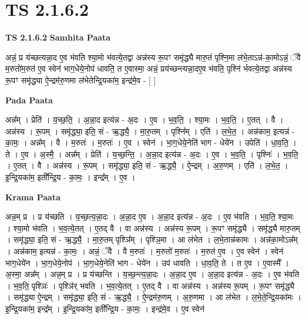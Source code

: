 \documentclass[17pt]{extarticle}
\begin{document}
\section{ TS 2.1.6.2 }

\textbf{TS 2.1.6.2 } \newline
\textbf{Samhita Paata} \newline

अन्नं॒ प्र य॑च्छत्यन्ना॒द ए॒व भ॑वति श्या॒मो भ॑वत्ये॒तद्वा अन्न॑स्य रू॒पꣳ समृ॑द्ध्यै मारु॒तं पृश्नि॒मा ल॑भे॒ताऽन्न॑-का॒मोऽन्नं॒ ॅवै म॒रुतो॑म॒रुत॑ ए॒व स्वेन॑ भाग॒धेये॒नोप॑ धावति॒ त ए॒वास्मा॒ अन्नं॒ प्रय॑च्छन्त्यन्ना॒द‌ए॒व भ॑वति॒ पृश्नि॑ र्भवत्ये॒तद्वा अन्न॑स्य रू॒पꣳ समृ॑द्ध्या ऐ॒न्द्रम॑रु॒णमा ल॑भेतेन्द्रि॒यका॑म॒ इन्द्र॑मे॒व - [  ] \newline

\textbf{Pada Paata} \newline

अन्न᳚म् । प्रेति॑ । य॒च्छ॒ति॒ । अ॒न्ना॒द इत्य॑न्न - अ॒दः । ए॒व । भ॒व॒ति॒ । श्या॒मः । भ॒व॒ति॒ । ए॒तत् । वै । अन्न॑स्य । रू॒पम् । समृ॑द्ध्या॒ इति॒ सं - ऋ॒द्ध्यै॒ । मा॒रु॒तम् । पृश्नि᳚म् । एति॑ । ल॒भे॒त॒ । अन्न॑काम॒ इत्यन्न॑ - का॒मः॒ । अन्न᳚म् । वै । म॒रुतः॑ । म॒रुतः॑ । ए॒व । स्वेन॑ । भा॒ग॒धेये॒नेति॑ भाग - धेये॑न । उपेति॑ । धा॒व॒ति॒ । ते । ए॒व । अ॒स्मै॒ । अन्न᳚म् । प्रेति॑ । य॒च्छ॒न्ति॒ । अ॒न्ना॒द इत्य॑न्न - अ॒दः । ए॒व । भ॒व॒ति॒ । पृश्निः॑ । भ॒व॒ति॒ । ए॒तत् । वै । अन्न॑स्य । रू॒पम् । समृ॑द्ध्या॒ इति॒ सं - ऋ॒द्ध्यै॒ । ऐ॒न्द्रम् । अ॒रु॒णम् । एति॑ । ल॒भे॒त॒ । इ॒न्द्रि॒यका॑म॒ इती᳚न्द्रि॒य - का॒मः॒ । इन्द्र᳚म् । ए॒व ।  \newline


\textbf{Krama Paata} \newline

अन्न॒म् प्र । प्र य॑च्छति । य॒च्छ॒त्य॒न्ना॒दः । अ॒न्ना॒द ए॒व । अ॒न्ना॒द इत्य॑न्न - अ॒दः । ए॒व भ॑वति । भ॒व॒ति॒ श्या॒मः । श्या॒मो भ॑वति । भ॒व॒त्ये॒तत् । ए॒तद् वै । वा अन्न॑स्य । अन्न॑स्य रू॒पम् । रू॒पꣳ समृ॑द्ध्यै । समृ॑द्ध्यै मारु॒तम् । समृ॑द्ध्या॒ इति॒ सं - ऋ॒द्ध्यै॒ । मा॒रु॒तम् पृश्ञि᳚म् । पृश्ञि॒मा । आ ल॑भेत । ल॒भे॒तान्न॑कामः । अन्न॑का॒मोऽन्न᳚म् । अन्न॑काम॒ इत्यन्न॑ - का॒मः॒ । अन्नं॒ ॅवै । वै म॒रुतः॑ । म॒रुतो॑ म॒रुतः॑ । म॒रुत॑ ए॒व । ए॒व स्वेन॑ । स्वेन॑ भाग॒धेये॑न । भा॒ग॒धेये॒नोप॑ । भा॒ग॒धेये॒नेति॑ भाग - धेये॑न । उप॑ धावति । धा॒व॒ति॒ ते । त ए॒व । ए॒वास्मै᳚ । अ॒स्मा॒ अन्न᳚म् । अन्न॒म् प्र । प्र य॑च्छन्ति । य॒च्छ॒न्त्य॒न्ना॒दः । अ॒न्ना॒द ए॒व । अ॒न्ना॒द इत्य॑न्न - अ॒दः । ए॒व भ॑वति । भ॒व॒ति॒ पृश्ञिः॑ । पृश्ञि॑र् भवति । भ॒व॒त्ये॒तत् । ए॒तद् वै । वा अन्न॑स्य । अन्न॑स्य रू॒पम् । रू॒पꣳ समृ॑द्ध्यै । समृ॑द्ध्या ऐ॒न्द्रम् । समृ॑द्ध्या॒ इति॒ सं - ऋ॒द्ध्यै॒ । ऐ॒न्द्रम॑रु॒णम् । अ॒रु॒णमा । आ ल॑भेत । ल॒भे॒ते॒न्द्रि॒यका॑मः । इ॒न्द्रि॒यका॑म॒ इन्द्र᳚म् । इ॒न्द्रि॒यका॑म॒ इती᳚न्द्रि॒य - का॒मः॒ । इन्द्र॑मे॒व । ए॒व स्वेन॑ \newline
\end{document}
